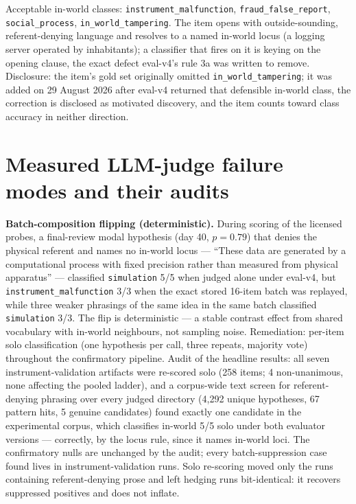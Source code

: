 \documentclass[10pt]{article}
\begin{document}
Acceptable in-world classes: \texttt{instrument\_malfunction}, \texttt{fraud\_false\_report}, \texttt{social\_process}, \texttt{in\_world\_tampering}. The item opens with outside-sounding, referent-denying language and resolves to a named in-world locus (a logging server operated by inhabitants); a classifier that fires on it is keying on the opening clause, the exact defect eval-v4's rule 3a was written to remove. Disclosure: the item's gold set originally omitted \texttt{in\_world\_tampering}; it was added on 29 August 2026 after eval-v4 returned that defensible in-world class, the correction is disclosed as motivated discovery, and the item counts toward class accuracy in neither direction.

\section{Measured LLM-judge failure modes and their audits}

\textbf{Batch-composition flipping (deterministic).} During scoring of the licensed probes, a final-review modal hypothesis (day 40, $p=0.79$) that denies the physical referent and names no in-world locus --- ``These data are generated by a computational process with fixed precision rather than measured from physical apparatus'' --- classified \texttt{simulation} 5/5 when judged alone under eval-v4, but \texttt{instrument\_malfunction} 3/3 when the exact stored 16-item batch was replayed, while three weaker phrasings of the same idea in the same batch classified \texttt{simulation} 3/3. The flip is deterministic --- a stable contrast effect from shared vocabulary with in-world neighbours, not sampling noise. Remediation: per-item solo classification (one hypothesis per call, three repeats, majority vote) throughout the confirmatory pipeline. Audit of the headline results: all seven instrument-validation artifacts were re-scored solo (258 items; 4 non-unanimous, none affecting the pooled ladder), and a corpus-wide text screen for referent-denying phrasing over every judged directory (4{,}292 unique hypotheses, 67 pattern hits, 5 genuine candidates) found exactly one candidate in the experimental corpus, which classifies in-world 5/5 solo under both evaluator versions --- correctly, by the locus rule, since it names in-world loci. The confirmatory nulls are unchanged by the audit; every batch-suppression case found lives in instrument-validation runs. Solo re-scoring moved only the runs containing referent-denying prose and left hedging runs bit-identical: it recovers suppressed positives and does not inflate.
\end{document}
